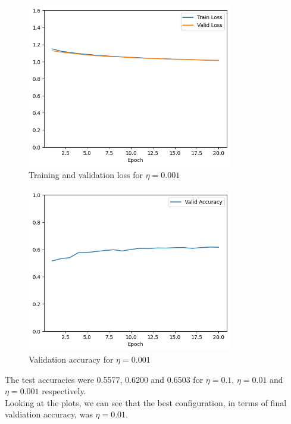 \documentclass{article}
\begin{document}
\begin{figure}[H]
    \centering
    \includegraphics[width=0.8\textwidth]{"plots/logistic_regression-training-loss-batch-16-lr-0.001-epochs-20-l2-0-opt-sgd.png"}
    \caption{Training and validation loss for $\eta = 0.001$}
    \label{2.1 0.001 Loss Plot}
\end{figure}

\begin{figure}[H]
    \centering
    \includegraphics[width=0.8\textwidth]{"plots/logistic_regression-validation-accuracy-batch-16-lr-0.001-epochs-20-l2-0-opt-sgd.png"}
    \caption{Validation accuracy for $\eta = 0.001$}
    \label{2.1 0.001 Acc Plot}
\end{figure}

The test accuracies were 0.5577, 0.6200 and 0.6503 for $\eta = 0.1$, $\eta = 0.01$ and $\eta = 0.001$ respectively.\\
Looking at the plots, we can see that the best configuration, in terms of final valdiation accuracy, was $\eta = 0.01$.\\
\end{document}
